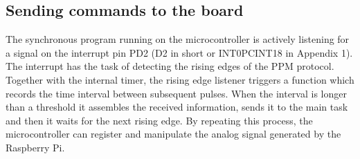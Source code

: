 \documentclass{IEEEtran}
\begin{document}
\subsection*{Sending commands to the board}
The synchronous program running on the microcontroller is actively listening for a signal on the interrupt pin PD2 (D2 in short or INT0PCINT18 in Appendix 1). The interrupt has the task of detecting the rising edges of the PPM protocol. Together with the internal timer, the rising edge listener triggers a function which records the time interval between subsequent pulses. When the interval is longer than a threshold it assembles the received information, sends it to the main task and then it waits for the next rising edge. By repeating this process, the microcontroller can register and manipulate the analog signal generated by the Raspberry Pi.
\end{document}

